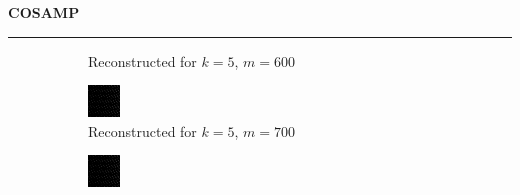 \documentclass[a4paper,12pt]{article}
\newenvironment{solution}[2][]{%
    \begin{mdframed}[linecolor=blue!70!black, linewidth=2pt, roundcorner=10pt, backgroundcolor=yellow!10!white, skipabove=12pt, skipbelow=12pt]%
        \textbf{\large #2}
        \par\noindent\rule{\textwidth}{0.4pt}
}{
    \end{mdframed}
}
\begin{document}
\begin{solution}{COSAMP}
\begin{figure}[H]
\begin{subfigure}[t]{0.23\textwidth}
            \caption{Reconstructed for $k = 5$, $m = 600$}
        \end{subfigure}
        \begin{subfigure}[t]{0.23\textwidth}
            \centering
            \includegraphics[width=\textwidth]{../images/cosamp/Reconstructed_k_5_m_700.png}
            \caption{Reconstructed for $k = 5$, $m = 700$}
        \end{subfigure}
        \begin{subfigure}[t]{0.23\textwidth}
            \centering
            \includegraphics[width=\textwidth]{../images/cosamp/Reconstructed_k_5_m_800.png}

\end{subfigure}
\end{figure}
\end{solution}
\end{document}
